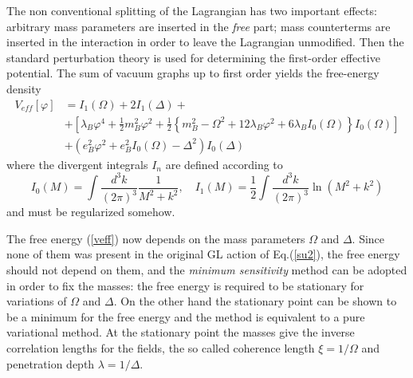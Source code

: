 \documentclass[aps,preprint]{revtex4}
\newcommand{\BE}{\begin{equation}}
\newcommand{\EE}{\end{equation}}
\newcommand{\nn}{\nonumber}
\begin{document}
The non conventional splitting of the Lagrangian has two important effects: arbitrary mass parameters
are inserted in the {\it free} part; mass counterterms are inserted in the interaction in order
to leave the Lagrangian unmodified. Then the standard perturbation theory is used for determining the
first-order effective potential. The sum of vacuum graphs up to first order yields the free-energy
density
\begin{align}
V_{eff}[\varphi] &= I_{1}(\Omega)+2I_{1}(\Delta)+\nn\\
&+ \left[
\lambda_{B}\varphi^{4}+\frac{1}{2}m_{B}^{2}\varphi^{2}+\frac{1}{2}
\left\{
m^{2}_{B}-\Omega^{2}+12\lambda_{B}\varphi^{2}+6\lambda_{B}I_{0}(\Omega)
\right\} I_{0}(\Omega) \right] \nn\\
&+\left( e_B^{2}\varphi^{2}+e_B^{2}I_{0}(\Omega)-\Delta^{2} \right)
I_{0}(\Delta)
\label{veff}
\end{align}
where the divergent integrals $I_n$ are defined according to
\BE
I_0 (M)=\int\frac{d^3 k}{(2\pi)^3} \frac{1}{M^2+k^2}, \quad
I_1 (M)=\frac{1}{2}\int\frac{d^3 k}{(2\pi)^3} \ln(M^2+k^2)
\label{In}
\EE
and must be regularized somehow.

The free energy (\ref{veff}) now depends on the mass parameters
$\Omega$ and $\Delta$. Since none of them was present in the original
GL action of Eq.(\ref{su2}), the free energy should not depend on them,
and the {\it minimum sensitivity} method\cite{minimal} 
can be adopted in order to fix the masses: the free energy is required
to be stationary for variations of $\Omega$ and $\Delta$. On the other
hand the stationary point can be shown to be a minimum for the free
energy and the method is equivalent 
to a pure variational method\cite{ibanez}.
At the stationary point the masses give the inverse correlation lengths
for the fields, the so called coherence length $\xi=1/\Omega$ and 
penetration depth $\lambda=1/\Delta$.
\end{document}
